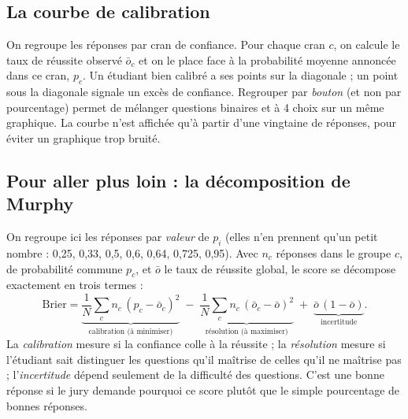 \documentclass[11pt,a4paper]{article}
\begin{document}
\begin{appendices}
\subsection{La courbe de calibration}
On regroupe les réponses par cran de confiance. Pour chaque cran $c$, on calcule le taux de réussite observé $\bar{o}_c$ et on le place face à la probabilité moyenne annoncée dans ce cran, $p_c$. Un étudiant bien calibré a ses points sur la diagonale ; un point sous la diagonale signale un excès de confiance. Regrouper par \emph{bouton} (et non par pourcentage) permet de mélanger questions binaires et à 4 choix sur un même graphique. La courbe n'est affichée qu'à partir d'une vingtaine de réponses, pour éviter un graphique trop bruité.

\subsection{Pour aller plus loin : la décomposition de Murphy}
On regroupe ici les réponses par \emph{valeur} de $p_i$ (elles n'en prennent qu'un petit nombre : 0,25, 0,33, 0,5, 0,6, 0,64, 0,725, 0,95). Avec $n_c$ réponses dans le groupe $c$, de probabilité commune $p_c$, et $\bar{o}$ le taux de réussite global, le score se décompose exactement en trois termes :
\[
  \mathrm{Brier} =
  \underbrace{\frac{1}{N}\sum_{c} n_c\,(p_c - \bar{o}_c)^2}_{\text{calibration (à minimiser)}}
  \; - \;
  \underbrace{\frac{1}{N}\sum_{c} n_c\,(\bar{o}_c - \bar{o})^2}_{\text{résolution (à maximiser)}}
  \; + \;
  \underbrace{\bar{o}\,(1 - \bar{o})}_{\text{incertitude}} .
\]
La \emph{calibration} mesure si la confiance colle à la réussite ; la \emph{résolution} mesure si l'étudiant sait distinguer les questions qu'il maîtrise de celles qu'il ne maîtrise pas ; l'\emph{incertitude} dépend seulement de la difficulté des questions. C'est une bonne réponse si le jury demande pourquoi ce score plutôt que le simple pourcentage de bonnes réponses.

\end{appendices}
\end{document}
